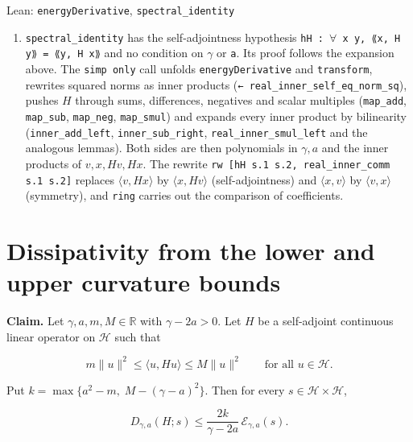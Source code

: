 \documentclass[11pt,a4paper]{article}
\begin{document}
\begin{leanbox}{Lean: \texttt{energyDerivative}, \texttt{spectral\_\allowbreak{}identity}}
\begin{enumerate}
\item \texttt{spectral\_\allowbreak{}identity} has the self-adjointness hypothesis \texttt{h\allowbreak{}H : \ensuremath{\forall} x y, {\leanfallback ⟪}x, H y{\leanfallback ⟫} = {\leanfallback ⟪}y, H x{\leanfallback ⟫}} and no condition on \texttt{\ensuremath{\gamma}} or \texttt{a}. Its proof follows the expansion above. The \texttt{simp only} call unfolds \texttt{energy\allowbreak{}Derivative} and \texttt{transform}, rewrites squared norms as inner products (\texttt{← real\_\allowbreak{}inner\_\allowbreak{}self\_\allowbreak{}eq\_\allowbreak{}norm\_\allowbreak{}sq}), pushes \(H\) through sums, differences, negatives and scalar multiples (\texttt{map\_\allowbreak{}add}, \texttt{map\_\allowbreak{}sub}, \texttt{map\_\allowbreak{}neg}, \texttt{map\_\allowbreak{}smul}) and expands every inner product by bilinearity (\texttt{inner\_\allowbreak{}add\_\allowbreak{}left}, \texttt{inner\_\allowbreak{}sub\_\allowbreak{}right}, \texttt{real\_\allowbreak{}inner\_\allowbreak{}smul\_\allowbreak{}left} and the analogous lemmas). Both sides are then polynomials in \(\gamma,a\) and the inner products of \(v,x,Hv,Hx\). The rewrite \texttt{rw [h\allowbreak{}H s.\allowbreak{}1 s.\allowbreak{}2, real\_\allowbreak{}inner\_\allowbreak{}comm s.\allowbreak{}1 s.\allowbreak{}2]} replaces \(\langle v,Hx\rangle\) by \(\langle x,Hv\rangle\) (self-adjointness) and \(\langle x,v\rangle\) by \(\langle v,x\rangle\) (symmetry), and \texttt{ring} carries out the comparison of coefficients.

\end{enumerate}
\end{leanbox}

\section{\texorpdfstring{Dissipativity from the lower and upper curvature bounds}{Dissipativity from the lower and upper curvature bounds}}


\textbf{Claim.} Let \(\gamma,a,m,M\in\mathbb R\) with \(\gamma-2a>0\). Let \(H\) be a self-adjoint continuous linear operator on \(\mathcal H\) such that


\[m\|u\|^2\le\langle u,Hu\rangle\le M\|u\|^2\qquad\text{for all }u\in\mathcal H.\]


Put \(k=\max\{a^2-m,\;M-(\gamma-a)^2\}\). Then for every \(s\in\mathcal H\times\mathcal H\),


\[D_{\gamma,a}(H;s)\le\frac{2k}{\gamma-2a}\,\mathcal E_{\gamma,a}(s).\]
\end{document}
